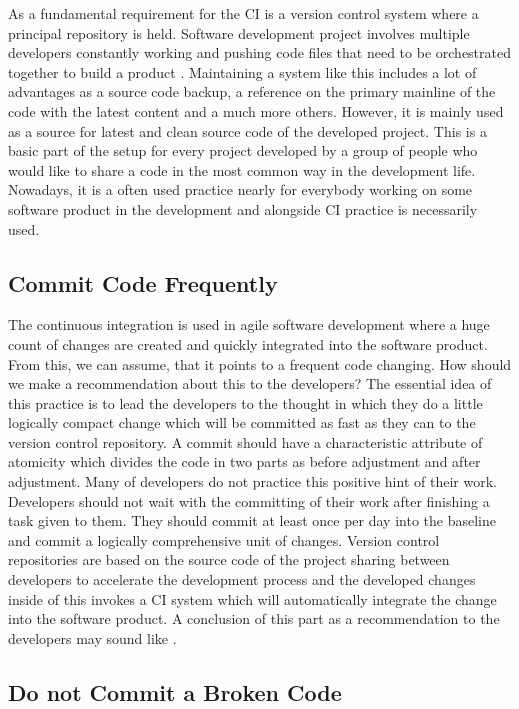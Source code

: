As a fundamental requirement for the CI is a version control system where a principal repository is held. Software development project involves multiple developers constantly working and pushing code files that need to be orchestrated together to build a product \cite{CI-BP1}. Maintaining a system like this includes a lot of advantages as a source code backup, a reference on the primary mainline of the code with the latest content and a much more others. However, it is mainly used as a source for latest and clean source code of the developed project. This is a basic part of the setup for every project developed by a group of people who would like to share a code in the most common way in the development life. Nowadays, it is a often used practice nearly for everybody working on some software product in the development and alongside CI practice is necessarily used.

\subsection{Commit Code Frequently}

The continuous integration is used in agile software development where a huge count of changes are created and quickly integrated into the software product. From this, we can assume, that it points to a frequent code changing. How should we make a recommendation about this to the developers? The essential idea of this practice is to lead the developers to the thought in which they do a little logically compact change which will be committed as fast as they can to the version control repository. A commit should have a characteristic attribute of atomicity which divides the code in two parts as before adjustment and after adjustment. Many of developers do not practice this positive hint of their work. Developers should not wait with the committing of their work after finishing a task given to them. They should commit at least once per day into the baseline and commit a logically comprehensive unit of changes. Version control repositories are based on the source code of the project sharing between developers to accelerate the development process and the developed changes inside of this invokes a CI system which will automatically integrate the change into the software product. A conclusion of this part as a recommendation to the developers may sound like .

\subsection{Do not Commit a Broken Code}

